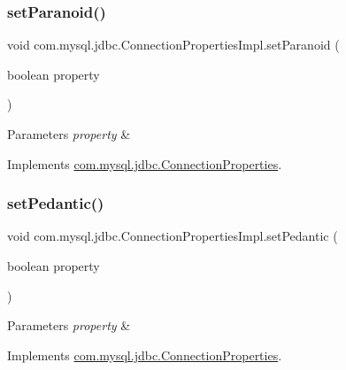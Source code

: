 \subsubsection{\texorpdfstring{set\+Paranoid()}{setParanoid()}}
{\footnotesize\ttfamily void com.\+mysql.\+jdbc.\+Connection\+Properties\+Impl.\+set\+Paranoid (\begin{DoxyParamCaption}\item[{boolean}]{property }\end{DoxyParamCaption})}


\begin{DoxyParams}{Parameters}
{\em property} & \\
\hline
\end{DoxyParams}


Implements \mbox{\hyperlink{interfacecom_1_1mysql_1_1jdbc_1_1_connection_properties_a01cf4f506ad942b96a36708c33221a48}{com.\+mysql.\+jdbc.\+Connection\+Properties}}.

\mbox{\label{classcom_1_1mysql_1_1jdbc_1_1_connection_properties_impl_ad7ae4a320df7a8e5dc59507595393acf}} 
\subsubsection{\texorpdfstring{set\+Pedantic()}{setPedantic()}}
{\footnotesize\ttfamily void com.\+mysql.\+jdbc.\+Connection\+Properties\+Impl.\+set\+Pedantic (\begin{DoxyParamCaption}\item[{boolean}]{property }\end{DoxyParamCaption})}


\begin{DoxyParams}{Parameters}
{\em property} & \\
\hline
\end{DoxyParams}


Implements \mbox{\hyperlink{interfacecom_1_1mysql_1_1jdbc_1_1_connection_properties_acc7191665477c54523bc25845278b99f}{com.\+mysql.\+jdbc.\+Connection\+Properties}}.

\mbox{\label{classcom_1_1mysql_1_1jdbc_1_1_connection_properties_impl_a170c65de1584d4588ea15ca73e1812bd}} 
